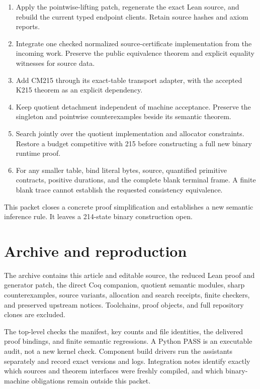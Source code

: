 \documentclass[11pt]{article}
\newcommand{\code}[1]{\texttt{\detokenize{#1}}}
\begin{document}
\begin{enumerate}
\item Apply the pointwise-lifting patch, regenerate the exact Lean source, and rebuild the current typed endpoint clients. Retain source hashes and axiom reports.
\item Integrate one checked normalized source-certificate implementation from the incoming work. Preserve the public equivalence theorem and explicit equality witnesses for source data.
\item Add CM215 through its exact-table transport adapter, with the accepted K215 theorem as an explicit dependency.
\item Keep quotient detachment independent of machine acceptance. Preserve the singleton and pointwise counterexamples beside its semantic theorem.
\item Search jointly over the quotient implementation and allocator constraints. Restore a budget competitive with 215 before constructing a full new binary runtime proof.
\item For any smaller table, bind literal bytes, source, quantified primitive contracts, positive durations, and the complete blank terminal frame. A finite blank trace cannot establish the requested consistency equivalence.
\end{enumerate}

This packet closes a concrete proof simplification and establishes a new semantic inference rule. It leaves a 214-state binary construction open.

\section{Archive and reproduction}

The archive contains this article and editable source, the reduced Lean proof and generator patch, the direct Coq companion, quotient semantic modules, sharp counterexamples, source variants, allocation and search receipts, finite checkers, and preserved upstream notices. Toolchains, proof objects, and full repository clones are excluded.

The top-level \code{verify.py} checks the manifest, key counts and file identities, the delivered proof bindings, and finite semantic regressions. A Python PASS is an executable audit, not a new kernel check. Component build drivers run the assistants separately and record exact versions and logs. Integration notes identify exactly which sources and theorem interfaces were freshly compiled, and which binary-machine obligations remain outside this packet.
\end{document}
